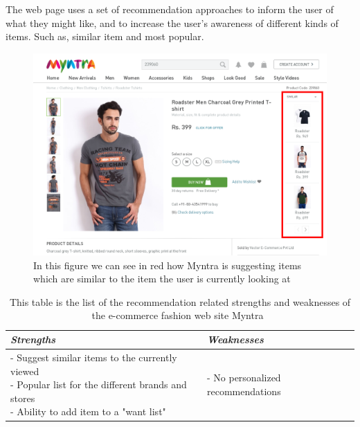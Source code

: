     The web page uses a set of recommendation approaches to inform the user of what they might like, and to increase the user's awareness of different kinds of items. Such as, similar item and most popular.
    \begin{figure}[H]
        \centering
        \includegraphics[width=5in]{image/myntiaSimilarExample.png}
        \caption[Example of Myntra's "similar item" approach]{In this figure we can see in red how Myntra is suggesting items which are similar to the item the user is currently looking at}
        \label{figure:myntiaSimilarEx}
    \end{figure}
    \begin{table}[H]
        \centering
        \begin{tabular}{l|l}
            \toprule
            \emph{Strengths} & \emph{Weaknesses} \\ \hline
            \pbox{9cm}{
                - Suggest similar items to the currently viewed \\
                - Popular list for the different brands and stores \\
                - Ability to add item to a "want list"
            } & \pbox{9cm}{
                - No personalized recommendations \\
            } \\ \bottomrule
        \end{tabular}
        \caption[Recommendation related strengths and weaknesses of Myntra~\cite{myntra}]{This table is the list of the recommendation related strengths and weaknesses of the e-commerce fashion web site Myntra~\cite{myntra}}
        \label{table:ecommerceMyntra}
    \end{table}

